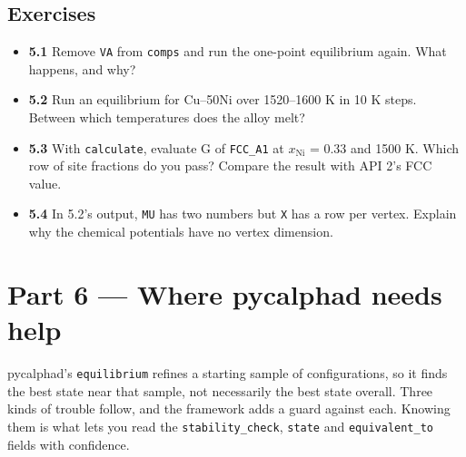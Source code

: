 \documentclass[12pt,a4paper]{article}
\begin{document}
\subsection*{Exercises}
\begin{itemize}
\item \textbf{5.1} Remove \texttt{\textquotedbl{}VA\textquotedbl{}} from \texttt{comps} and run the one-point equilibrium again. What happens, and why?
\item \textbf{5.2} Run an equilibrium for Cu--50Ni over 1520--1600 K in 10 K steps. Between which temperatures does the alloy melt?
\item \textbf{5.3} With \texttt{calculate}, evaluate G of \texttt{FCC\_\allowbreak{}A1} at \(x_{\mathrm{Ni}}\) = 0.33 and 1500 K. Which row of site fractions do you pass? Compare the result with API 2's FCC value.
\item \textbf{5.4} In 5.2's output, \texttt{MU} has two numbers but \texttt{X} has a row per vertex. Explain why the chemical potentials have no vertex dimension.
\end{itemize}

\section*{Part 6 --- Where pycalphad needs help}
pycalphad's \texttt{equilibrium} refines a starting sample of configurations, so it finds the best state near that sample, not necessarily the best state overall. Three kinds of trouble follow, and the framework adds a guard against each. Knowing them is what lets you read the \texttt{stability\_\allowbreak{}check}, \texttt{state} and \texttt{equivalent\_\allowbreak{}to} fields with confidence.


\end{document}
